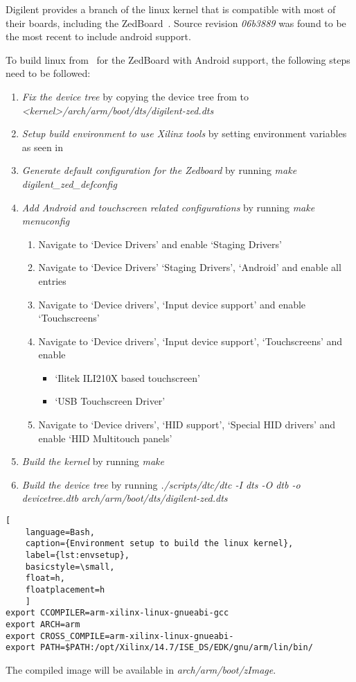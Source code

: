 Digilent provides a branch of the linux kernel that is compatible with most of
their boards, including the ZedBoard~\cite{DigilentLinux}.
Source revision \emph{06b3889} was found to be the most recent to include
android support.

To build linux from~\cite{DigilentLinux} for the ZedBoard with Android support,
the following steps need to be followed:
\begin{enumerate}
	\item \emph{Fix the device tree} by copying the device tree from
		\cite{DigilentReferenceDesign} to
		\emph{<kernel>/arch/arm/boot/dts/digilent-zed.dts}
	\item \emph{Setup build environment to use Xilinx tools} by setting
		environment variables as seen in 
	\item \emph{Generate default configuration for the Zedboard} by running
		\emph{make digilent\_zed\_defconfig}
	\item \emph{Add Android and touchscreen related configurations} by running
		\emph{make menuconfig}
		\begin{enumerate}
			\item Navigate to `Device Drivers' and enable `Staging Drivers'
			\item Navigate to `Device Drivers' `Staging Drivers', `Android'
				and enable all entries
			\item Navigate to `Device drivers', `Input device support' and
				enable `Touchscreens'
			\item Navigate to `Device drivers', `Input device support',
				`Touchscreens' and enable
				\begin{itemize}
					\item `Ilitek ILI210X based touchscreen'
					\item `USB Touchscreen Driver'
				\end{itemize}
			\item Navigate to `Device drivers', `HID support', `Special HID
				drivers' and enable `HID Multitouch panels'
		\end{enumerate}
	\item \emph{Build the kernel} by running \emph{make}
	\item \emph{Build the device tree} by running \emph{./scripts/dtc/dtc -I dts
		-O dtb -o devicetree.dtb arch/arm/boot/dts/digilent-zed.dts}
\end{enumerate}
\begin{lstlisting}[
	language=Bash,
	caption={Environment setup to build the linux kernel},
	label={lst:envsetup},
	basicstyle=\small,
	float=h,
	floatplacement=h
	]
export CCOMPILER=arm-xilinx-linux-gnueabi-gcc
export ARCH=arm
export CROSS_COMPILE=arm-xilinx-linux-gnueabi-
export PATH=$PATH:/opt/Xilinx/14.7/ISE_DS/EDK/gnu/arm/lin/bin/		
\end{lstlisting}
The compiled image will be available in \emph{arch/arm/boot/zImage}.
